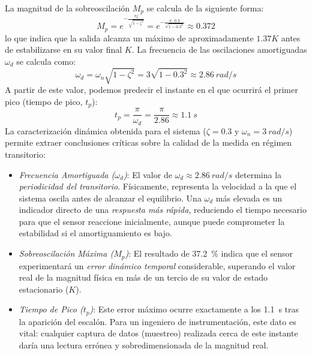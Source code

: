 La magnitud de la sobreoscilación $M_p$ se calcula de la siguiente forma:
\begin{equation}
    M_p = e^{-\frac{\pi \zeta}{\sqrt{1-\zeta^2}}} = e^{-\frac{\pi \cdot 0.3}{\sqrt{1-0.3^2}}} \approx 0.372
\end{equation}
lo que indica que la salida alcanza un máximo de aproximadamente $1.37K$ antes de estabilizarse en su valor final $K$. La frecuencia de las oscilaciones amortiguadas $\omega_d$ se calcula como:
\begin{equation}
    \omega_d = \omega_n \sqrt{1-\zeta^2} = 3 \sqrt{1-0.3^2} \approx \SI{2.86}{rad/s}
\end{equation}
A partir de este valor, podemos predecir el instante en el que ocurrirá el primer pico (tiempo de pico, $t_p$):
\begin{equation}
    t_p = \frac{\pi}{\omega_d} = \frac{\pi}{2.86} \approx \SI{1.1}{s}
\end{equation}
La caracterización dinámica obtenida para el sistema ($\zeta = 0.3$ y $\omega_n = \SI{3}{rad/s}$) permite extraer conclusiones críticas sobre la calidad de la medida en régimen transitorio:

\begin{itemize}
    \item \emph{Frecuencia Amortiguada ($\omega_d$)}: El valor de $\omega_d \approx \SI{2.86}{rad/s}$ determina la \textit{periodicidad del transitorio}. Físicamente, representa la velocidad a la que el sistema oscila antes de alcanzar el equilibrio. Una $\omega_d$ más elevada es un indicador directo de una \emph{respuesta más rápida}, reduciendo el tiempo necesario para que el sensor reaccione inicialmente, aunque puede comprometer la estabilidad si el amortiguamiento es bajo.
    
    \item \emph{Sobreoscilación Máxima ($M_p$)}: El resultado de \SI{37.2}{\percent} indica que el sensor experimentará un \textit{error dinámico temporal} considerable, superando el valor real de la magnitud física en más de un tercio de su valor de estado estacionario ($K$). 
    
    \item \emph{Tiempo de Pico ($t_p$)}: Este error máximo ocurre exactamente a los \SI{1.1}{s} tras la aparición del escalón. Para un ingeniero de instrumentación, este dato es vital: cualquier captura de datos (muestreo) realizada cerca de este instante daría una lectura errónea y sobredimensionada de la magnitud real.
\end{itemize}

